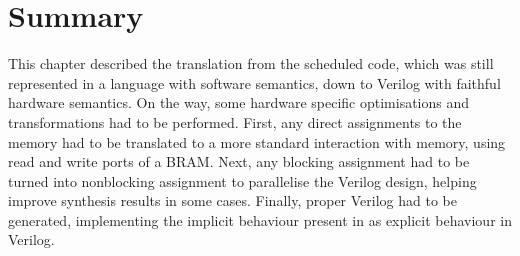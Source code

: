 \section{Summary}

This chapter described the translation from the scheduled code, which was still
represented in a language with software semantics, down to Verilog with faithful
hardware semantics.  On the way, some hardware specific optimisations and
transformations had to be performed.  First, any direct assignments to the
memory had to be translated to a more standard interaction with memory, using
read and write ports of a \gls{BRAM}.  Next, any blocking assignment had to be
turned into nonblocking assignment to parallelise the Verilog design, helping
improve synthesis results in some cases.  Finally, proper Verilog had to be
generated, implementing the implicit behaviour present in \htl{} as explicit
behaviour in Verilog.



